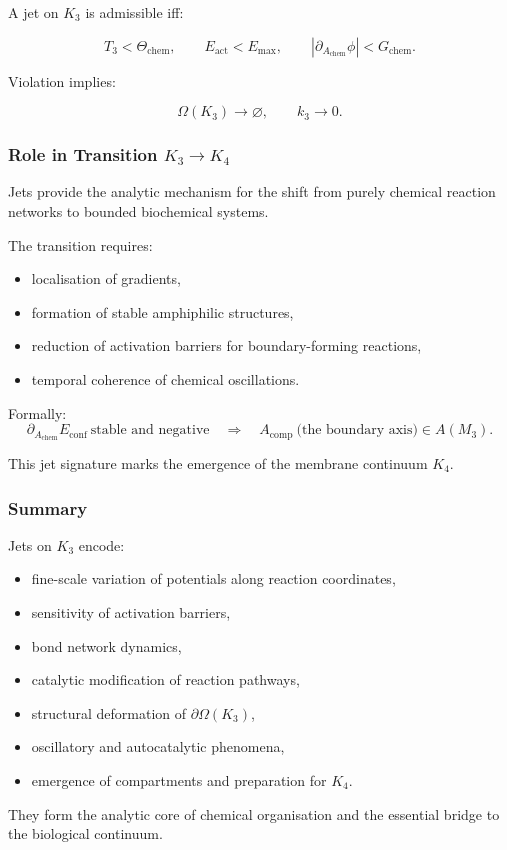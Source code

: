 A jet on $K_3$ is admissible iff:

\[
T_3 < \Theta_{\mathrm{chem}},
\qquad
E_{\mathrm{act}} < E_{\max},
\qquad
|\partial_{A_{\mathrm{chem}}}\phi| < G_{\mathrm{chem}}.
\]

Violation implies:

\[
\Omega(K_3)\to\varnothing,
\qquad
k_3\to 0.
\]



\subsubsection{Role in Transition \texorpdfstring{\texorpdfstring{$K_3\to K_4$}{K_3\to K_4}}{K3→K4}}

Jets provide the analytic mechanism for the shift from purely chemical
reaction networks to bounded biochemical systems.

The transition requires:

\begin{itemize}
    \item localisation of gradients,
    \item formation of stable amphiphilic structures,
    \item reduction of activation barriers for boundary-forming reactions,
    \item temporal coherence of chemical oscillations.
\end{itemize}

Formally:
\[
\partial_{A_{\mathrm{chem}}}E_{\mathrm{conf}}
\ \text{stable and negative}
\quad\Longrightarrow\quad
A_{\mathrm{comp}}\ \text{(the boundary axis)}\in A(M_3).
\]

This jet signature marks the emergence of the membrane continuum $K_4$.



\subsubsection{Summary}

Jets on $K_3$ encode:

\begin{itemize}
    \item fine-scale variation of potentials along reaction coordinates,
    \item sensitivity of activation barriers,
    \item bond network dynamics,
    \item catalytic modification of reaction pathways,
    \item structural deformation of $\partial\Omega(K_3)$,
    \item oscillatory and autocatalytic phenomena,
    \item emergence of compartments and preparation for $K_4$.
\end{itemize}

They form the analytic core of chemical organisation and the essential
bridge to the biological continuum.
